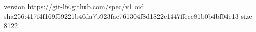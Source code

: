 version https://git-lfs.github.com/spec/v1
oid sha256:417f4f169f59221b40da7b923fae761304f8d1822c1447ffece81b0b4bf04e13
size 8122
